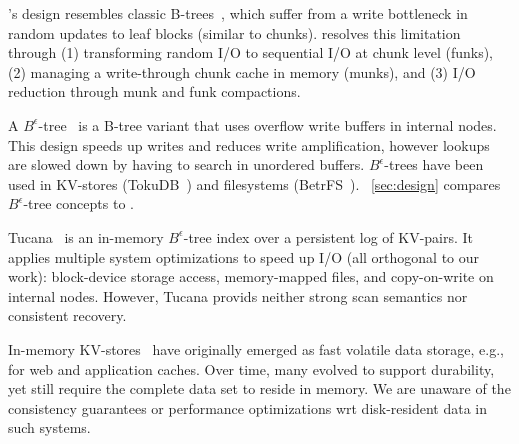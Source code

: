 \sys's design resembles classic B-trees~\cite{Knuth:1998:ACP:280635}, which suffer from a write bottleneck in random updates to 
leaf blocks (similar to chunks). \sys\/ resolves this limitation through (1) transforming random I/O to sequential I/O at chunk level
(funks), (2) managing a write-through chunk cache in memory (munks), and (3) I/O reduction through munk and funk compactions. 

A $B^{\epsilon}$-tree ~\cite{Brodal:2003:LBE:644108.644201}is a B-tree variant that uses overflow write buffers in internal nodes. 
This design speeds up writes and reduces write amplification, however lookups are slowed down by having to search in unordered 
buffers. $B^{\epsilon}$-trees have been used in KV-stores (TokuDB~\cite{TokuDB}) and filesystems (BetrFS~\cite{BetrFS}).  
~\cref{sec:design} compares $B^{\epsilon}$-tree concepts to \sys. 

Tucana~\cite{tucana} is an in-memory $B^{\epsilon}$-tree index over a persistent log of KV-pairs. It applies multiple system
optimizations to speed up I/O (all orthogonal to our work): block-device storage access, memory-mapped files, and copy-on-write 
on internal nodes. However, Tucana provids neither strong scan semantics nor consistent recovery. 

In-memory KV-stores~\cite{ignite, redis, memcached, Srinivasan:2016:AAR:3007263.3007276} have originally emerged as fast volatile 
data storage, e.g., for web and application caches. Over time, many evolved to support durability,
yet still require the complete data set to reside in memory.
We are unaware of the consistency guarantees or performance optimizations wrt disk-resident data in such systems. 

